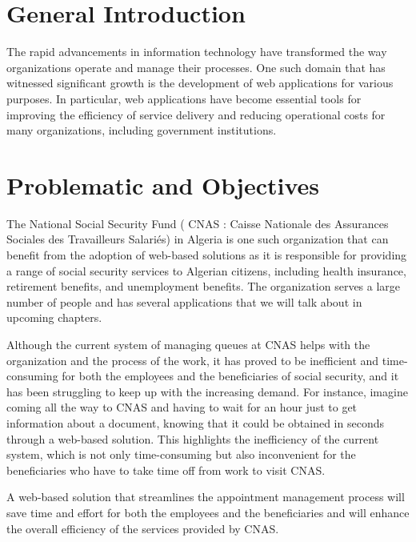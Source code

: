 \section*{General Introduction}

The rapid advancements in information technology have transformed the way organizations operate and manage their processes. One such domain that has witnessed significant growth is the development of web applications for various purposes. In particular, web applications have become essential tools for improving the efficiency of service delivery and reducing operational costs for many organizations, including government institutions.

\section*{Problematic and Objectives}
The National Social Security Fund ( CNAS : Caisse Nationale des Assurances Sociales des Travailleurs Salariés) in Algeria is one such organization that can benefit from the adoption of web-based solutions as it is responsible for providing a range of social security services to Algerian citizens, including health insurance, retirement benefits, and unemployment benefits. The organization serves a large number of people and has several applications that we will talk about in upcoming chapters. 

Although the current system of managing queues at CNAS helps with the organization and the process of the work, it has proved to be inefficient and time-consuming for both the employees and the beneficiaries of social security, and it has been struggling to keep up with the increasing demand. For instance, imagine coming all the way to CNAS and having to wait for an hour just to get information about a document, knowing that it could be obtained in seconds through a web-based solution. This highlights the inefficiency of the current system, which is not only time-consuming but also inconvenient for the beneficiaries who have to take time off from work to visit CNAS. 

A web-based solution that streamlines the appointment management process will save time and effort for both the employees and the beneficiaries and will enhance the overall efficiency of the services provided by CNAS.

